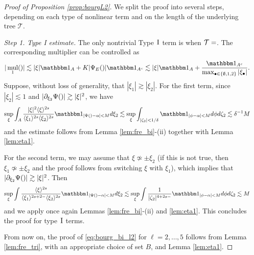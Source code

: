 \documentclass[a4paper,
11pt,  reqno]{amsart}
\makeatletter
\newcommand{\jap}[1]{\langle #1 \rangle}
\newcommand{\I}{\hspace{0.2mm}\textup{I}\hspace{0.2mm}}
\newcommand{\5}{\textup{V}}
\newcommand{\noi}{\noindent}
\newcommand{\ind}{\mathbbm 1}
\theoremstyle{remark}
\newcommand{\bul}{\bullet}
\newcommand{\TT}{\mathcal{T}}
\DeclareMathOperator{\mul}{mul}
\def\<#1>{\csname MH@symb@#1\endcsname}
\numberwithin{equation}{section}
\numberwithin{theorem}{section}
\makeatother
\begin{document}
\begin{proof}[Proof of Proposition \ref{prop:bourgL2}]
We split the proof into several steps, depending on each type of nonlinear term and on the length of the underlying tree $\TT$.
\medskip

\noi\textit{Step 1. Type I estimate.} The only nontrivial Type $\I$ term is when $\TT=\<1>$. The corresponding multiplier can be controlled as
$$
|\mul_1(\<1>)|\lesssim |\xi|\ind_A + K|\Psi_E(\<1>)|\ind_{A^c} \lesssim |\xi|\ind_A + \frac{\ind_{A^c}}{\max_{\bul\in\{\emptyset, 1, 2\}}|\xi_\bul|}.
$$
Suppose, without loss of generality, that $|\xi_1|\gtrsim |\xi_2|$. 
For the first term, since $|\xi_2|\lesssim 1$ and $|\partial_{\xi_2}\Psi(\<1>)|\gtrsim |\xi|^2$,  we have
$$
\sup_\xi \int_A \frac{|\xi|^2\jap{\xi}^{2s}}{\jap{\xi_1}^{2s}\jap{\xi_2}^{2s}} \ind_{|\Psi(\<1>)-\alpha|<M} d\xi_2 \lesssim \sup_\xi \int_{|\zeta_2|<1/\delta}  \ind_{|\phi-\alpha|<M} d\phi d\zeta_2 \lesssim \delta^{-1}M
$$
and the estimate follows from Lemma \ref{lem:fre_bi}-(ii) together with Lemma \ref{lem:eta1}.

For the second term, 
we may assume that $\xi\not\simeq \pm \xi_2$ (if this is not true, then $\xi_1\not\simeq \pm \xi_2$ and the proof follows from switching $\xi$ with $\xi_1$), which implies that $|\partial_{\xi_2}\Psi(\<1>)|\gtrsim |\xi|^2$. Then
$$
\sup_\xi \int \frac{\jap{\xi}^{2s}}{\jap{\xi_1}^{2s+2-}\jap{\xi_2}^{2s}} \ind_{|\Psi(\<1>)-\alpha|<M} d\xi_2 \lesssim \sup_\xi \int \frac{1}{|\zeta_2|^{4+2s-}} \ind_{|\phi-\alpha|<M}d\phi d\zeta_2 \lesssim M
$$
and we apply once again Lemmas \ref{lem:fre_bi}-(ii) and \ref{lem:eta1}. This concludes the proof for type $\I$ terms.

\medskip

From now on, the proof of \eqref{eq:bourg_bi_l2} for $\ell=2,\dots, 5$ follows from Lemma \ref{lem:fre_tri}, with an appropriate choice of set $B$, and Lemma \ref{lem:eta1}.

\medskip


\end{proof}
\end{document}
